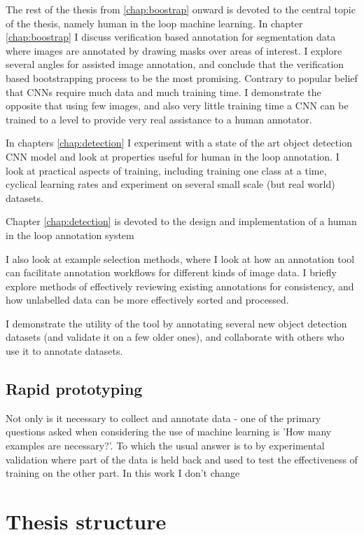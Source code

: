 The rest of the thesis from \ref{chap:boostrap} onward is devoted to the central topic of the thesis, namely human in the loop machine learning. In chapter \ref{chap:boostrap} I discuss verification based annotation for segmentation data where images are annotated by drawing masks over areas of interest. I explore several angles for assisted image annotation, and conclude that the verification based bootstrapping process to be the most promising. Contrary to popular belief that \gls{CNN}s require much data and much training time. I demonstrate the opposite that using few images, and also very little training time a \gls{CNN} can be trained to a level to provide very real assistance to a human annotator. 

In chapters \ref{chap:detection} I experiment with a state of the art object detection \gls{CNN} model and look at properties useful for human in the loop annotation. I look at practical aspects of training, including training one class at a time, cyclical learning rates and experiment on several small scale (but real world) datasets. 


Chapter \ref{chap:detection} is devoted to the design and implementation of a human in the loop annotation system 

I also look at example selection methods, where I look at how an annotation tool can facilitate annotation workflows for different kinds of image data. I briefly explore methods of effectively reviewing existing annotations for consistency, and how unlabelled data can be more effectively sorted and processed.

I demonstrate the utility of the tool by annotating several new object detection datasets (and validate it on a few older ones),  and collaborate with others who use it to annotate datasets.



\subsection {Rapid prototyping}

Not only is it necessary to collect and annotate data - one of the primary questions asked when considering the use of machine learning is 'How many examples are necessary?'. To which the usual answer is to by experimental validation where part of the data is held back and used to test the effectiveness of training on the other part. In this work I don't change 



\section {Thesis structure}


